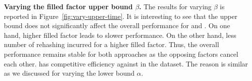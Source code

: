 \vspace{1mm}\noindent\textbf{Varying the filled factor upper bound $\beta$.}
The results for varying $\beta$ is reported in Figure~\ref{fig:vary-upper-time}. 
It is interesting to see that the upper bound does not significantly affect the overall performance for \megakv and \voter. 
On one hand, higher filled factor leads to slower  performance. On the other hand, less number of rehashing incurred for a higher filled factor. Thus, the overall performance remains stable for both approaches as the opposing factors cancel each other. \megakv has competitive efficiency against \voter in the \dsali dataset. The reason is similar as we discussed for varying the lower bound $\alpha$.







